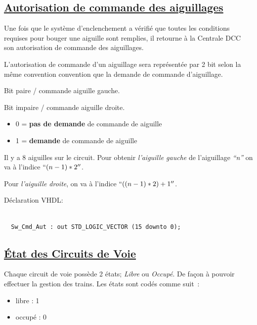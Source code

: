 \subsection{\underline{Autorisation de commande des aiguillages}}
\label{sec:ixl_dem_aig}

Une fois que le système d'enclenchement a vérifié que toutes les
conditions requises pour bouger une aiguille sont remplies, il 
retourne à la Centrale DCC son autorisation de commande des aiguillages.

L'autorisation de commande d'un aiguillage sera représentée par
2 bit selon la même convention convention que la demande de commande
d'aiguillage.

Bit paire / commande aiguille gauche.

Bit impaire / commande aiguille droite.

\medskip

\begin{itemize}
\item 0 = \textbf{pas de demande} de commande de aiguille
\item 1 = \textbf{demande} de commande de aiguille
\end{itemize}

\medskip


Il y a 8 aiguilles sur le circuit. Pour obtenir \emph{l'aiguille gauche} de
l'aiguillage \emph{``n''} on va à l'indice $``(n-1)*2''$.

Pour \emph{l'aiguille droite}, on va à l'indice $``((n-1)*2) + 1''$.

\bigskip

Déclaration VHDL:
\begin{lstlisting}[style=vhdl]

  Sw_Cmd_Aut : out STD_LOGIC_VECTOR (15 downto 0);

\end{lstlisting}

\newpage
  
\subsection{\underline{\'Etat des Circuits de Voie}}
\label{sec:st_sig}

Chaque circuit de voie possède 2 états; \emph{Libre} ou
\emph{Occupé}. De façon à pouvoir effectuer la gestion des trains.
Les états sont codés comme suit~:
\begin{itemize}
  \item libre : 1
  \item occupé : 0
\end{itemize}  

